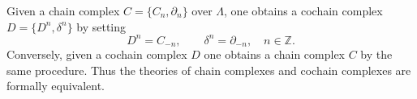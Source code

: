Given a chain complex $C = \{C_n, \partial_n\}$ over $\Lambda$, one obtains a cochain complex $D = \{D^n, \delta^n\}$ by setting
$$
D^n = C_{-n}, \qquad \delta^n = \partial_{-n}, \quad n \in \mathbb{Z}.
$$
Conversely, given a cochain complex $D$ one obtains a chain complex $C$ by the same procedure. Thus the theories of chain complexes and cochain complexes are formally equivalent.
